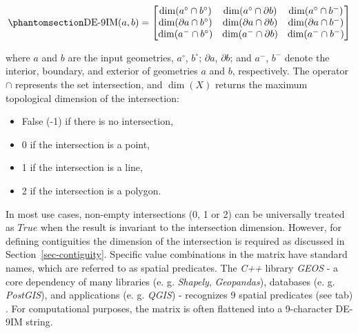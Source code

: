 \documentclass[
  english,
  12pt,
  a4paper,
]{article}
\providecommand{\tightlist}{%
  \setlength{\itemsep}{0pt}\setlength{\parskip}{0pt}}
\begin{document}
\begin{equation}\phantomsection\label{eq-de9im}{\text{DE-9IM}(a,b) = \begin{bmatrix} \dim(a^\circ \cap b^\circ) & \dim(a^\circ \cap \partial b) & \dim(a^\circ \cap b^-) \\ \dim(\partial a \cap b^\circ) & \dim(\partial a \cap \partial b) & \dim(\partial a \cap b^-) \\ \dim(a^- \cap b^\circ) & \dim(a^- \cap \partial b) & \dim(a^- \cap b^-) \end{bmatrix}}\end{equation}

where \(a\) and \(b\) are the input geometries, \(a^\circ\),
\(b^\circ\); \(\partial a\), \(\partial b\); and \(a^-\), \(b^-\) denote
the interior, boundary, and exterior of geometries \(a\) and \(b\),
respectively. The operator \(\cap\) represents the set intersection, and
\(\dim(X)\) returns the maximum topological dimension of the
intersection:

\begin{itemize}
\tightlist
\item
  False (-1) if there is no intersection,
\item
  0 if the intersection is a point,
\item
  1 if the intersection is a line,
\item
  2 if the intersection is a polygon.
\end{itemize}

In most use cases, non-empty intersections (0, 1 or 2) can be
universally treated as \(True\) when the result is invariant to the
intersection dimension. However, for defining contiguities the dimension
of the intersection is required as discussed in
Section~\ref{sec-contiguity}. Specific value combinations in the matrix
have standard names, which are referred to as spatial predicates. The
\emph{C++} library \emph{GEOS} - a core dependency of many libraries (e.
g. \emph{Shapely}, \emph{Geopandas}), databases (e. g. \emph{PostGIS}),
and applications (e. g. \emph{QGIS}) - recognizes 9 spatial predicates
(see tab) \citet{geos}. For computational purposes, the matrix is often
flattened into a 9-character DE-9IM string.
\end{document}
